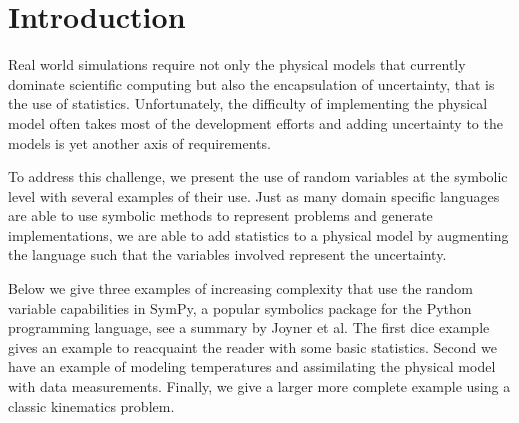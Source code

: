 \section{Introduction}

Real world simulations require not only the physical models that currently
dominate scientific computing but also the encapsulation of uncertainty, that
is the use of statistics.  Unfortunately, the difficulty of implementing the
physical model often takes most of the development efforts and adding
uncertainty to the models is yet another axis of requirements.

To address this challenge, we present the use of random variables at the
symbolic level with several examples of their use.  Just as many domain
specific languages are able to use symbolic methods to represent problems and
generate implementations, we are able to add statistics to a physical model by
augmenting the language such that the variables involved represent the
uncertainty.

Below we give three examples of increasing complexity that use the random
variable capabilities in SymPy, a popular symbolics package for the Python
programming language, see a summary by Joyner et al\cite{Joyner2011}.  The
first dice example gives an example to reacquaint the reader with some basic
statistics.  Second we have an example of modeling temperatures and
assimilating the physical model with data measurements. Finally, we give a
larger more complete example using a classic kinematics problem.
